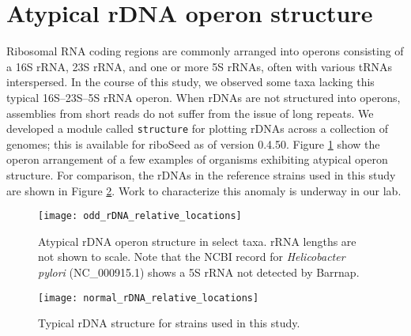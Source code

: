 \section*{Atypical rDNA operon structure}

Ribosomal RNA coding regions are commonly arranged into operons consisting of a 16S rRNA, 23S rRNA, and one or more 5S rRNAs, often with various tRNAs interspersed. In the course of this study, we observed some taxa lacking this typical 16S--23S--5S rRNA operon. When rDNAs are not structured into operons, assemblies from short reads do not suffer from the issue of long repeats. We developed a module called \texttt{structure} for plotting rDNAs across a collection of genomes; this is available for riboSeed as of version 0.4.50.  Figure \ref{fig:atypical} show the operon arrangement of a few examples of organisms exhibiting atypical operon structure. For comparison, the rDNAs in the reference strains used in this study are shown in Figure \ref{fig:typical}.  Work to characterize this anomaly is underway in our lab.

\begin{figure}[H]
  \centering
  \hspace*{0cm}\texttt{[image: odd\_rDNA\_relative\_locations]}
  \caption{Atypical rDNA operon structure in select taxa. rRNA lengths are not shown to scale. Note that the NCBI record for \textit{Helicobacter pylori} (NC\_000915.1) shows a 5S rRNA not detected by Barrnap. }
  \label{fig:atypical}
\end{figure}

\begin{figure}[H]
  \centering
  \hspace*{0cm}\texttt{[image: normal\_rDNA\_relative\_locations]}
  \caption{Typical rDNA structure for strains used in this study.}
  \label{fig:typical}
\end{figure}
